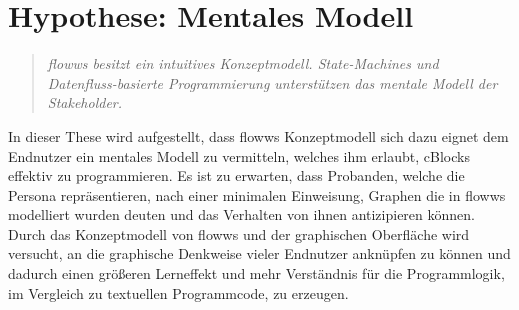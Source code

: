 \section{Hypothese: Mentales Modell}\label{sec:hypothese}
\begin{quote}
    \textit{flowws besitzt ein intuitives Konzeptmodell. State-Machines und Datenfluss-basierte Programmierung unterstützen das mentale Modell der Stakeholder.}
\end{quote}

In dieser These wird aufgestellt, dass flowws Konzeptmodell sich dazu eignet dem Endnutzer ein mentales Modell zu vermitteln, welches ihm erlaubt, cBlocks effektiv zu programmieren. Es ist zu erwarten, dass Probanden, welche die Persona repräsentieren, nach einer minimalen Einweisung, Graphen die in flowws modelliert wurden deuten und das Verhalten von ihnen antizipieren können. Durch das Konzeptmodell von flowws und der graphischen Oberfläche wird versucht, an die graphische Denkweise vieler Endnutzer anknüpfen zu können und dadurch einen größeren Lerneffekt und mehr Verständnis für die Programmlogik, im Vergleich zu textuellen Programmcode, zu erzeugen.

